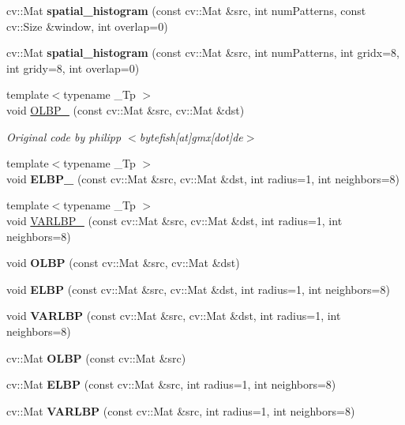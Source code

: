 \begin{DoxyCompactItemize}
\item 
\mbox{\label{namespacelbp_a969e1b4575a7bdaf68271e5855b2a3da}} 
cv\+::\+Mat {\bfseries spatial\+\_\+histogram} (const cv\+::\+Mat \&src, int num\+Patterns, const cv\+::\+Size \&window, int overlap=0)
\item 
\mbox{\label{namespacelbp_abc898ced323b22d8659c5a8a28a805b7}} 
cv\+::\+Mat {\bfseries spatial\+\_\+histogram} (const cv\+::\+Mat \&src, int num\+Patterns, int gridx=8, int gridy=8, int overlap=0)
\item 
{\footnotesize template$<$typename \+\_\+\+Tp $>$ }\\void \mbox{\hyperlink{namespacelbp_a640337219aa7c2a5326fa41af8269cc5}{O\+L\+B\+P\+\_\+}} (const cv\+::\+Mat \&src, cv\+::\+Mat \&dst)
\begin{DoxyCompactList}\small\item\em Original code by philipp $<$bytefish\mbox{[}at\mbox{]}gmx\mbox{[}dot\mbox{]}de$>$ \end{DoxyCompactList}\item 
\mbox{\label{namespacelbp_a0a37f5c75a252b844f2a0a53e39d4d1c}} 
{\footnotesize template$<$typename \+\_\+\+Tp $>$ }\\void {\bfseries E\+L\+B\+P\+\_\+} (const cv\+::\+Mat \&src, cv\+::\+Mat \&dst, int radius=1, int neighbors=8)
\item 
{\footnotesize template$<$typename \+\_\+\+Tp $>$ }\\void \mbox{\hyperlink{namespacelbp_a32baee0ff6f7c9703bc16f1e965e7324}{V\+A\+R\+L\+B\+P\+\_\+}} (const cv\+::\+Mat \&src, cv\+::\+Mat \&dst, int radius=1, int neighbors=8)
\item 
\mbox{\label{namespacelbp_aa36d3518cf5dfc2287a833598ecd2247}} 
void {\bfseries O\+L\+BP} (const cv\+::\+Mat \&src, cv\+::\+Mat \&dst)
\item 
\mbox{\label{namespacelbp_a7ca5bceb1a229bac0760c527a68e838e}} 
void {\bfseries E\+L\+BP} (const cv\+::\+Mat \&src, cv\+::\+Mat \&dst, int radius=1, int neighbors=8)
\item 
\mbox{\label{namespacelbp_a0b3e413fbb2c14f3d7e5c99370a6671d}} 
void {\bfseries V\+A\+R\+L\+BP} (const cv\+::\+Mat \&src, cv\+::\+Mat \&dst, int radius=1, int neighbors=8)
\item 
\mbox{\label{namespacelbp_a5cfe27bf479d2f8eaf4ff487ef7b6532}} 
cv\+::\+Mat {\bfseries O\+L\+BP} (const cv\+::\+Mat \&src)
\item 
\mbox{\label{namespacelbp_aeaa7fc1cf01cd9093610e6d89a7bb4a3}} 
cv\+::\+Mat {\bfseries E\+L\+BP} (const cv\+::\+Mat \&src, int radius=1, int neighbors=8)
\item 
\mbox{\label{namespacelbp_a17e665b32c7d6438478deecaa9174afc}} 
cv\+::\+Mat {\bfseries V\+A\+R\+L\+BP} (const cv\+::\+Mat \&src, int radius=1, int neighbors=8)
\end{DoxyCompactItemize}


